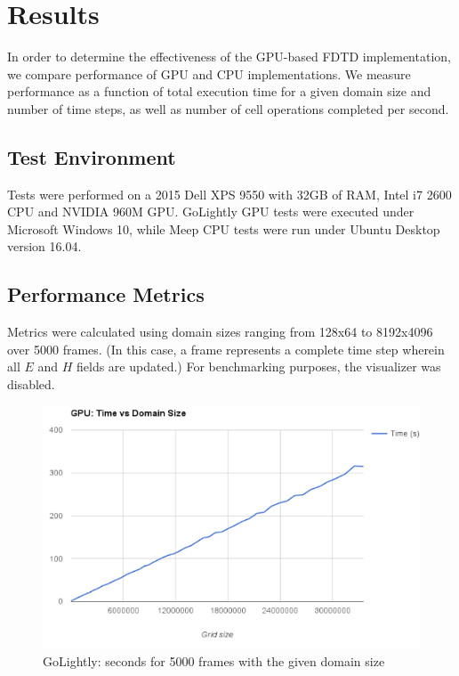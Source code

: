 \chapter{Results} \label{ch:conclusions}

In order to determine the effectiveness of the GPU-based FDTD implementation, we compare performance of GPU and CPU implementations. We measure performance as a function of total execution time for a given domain size and number of time steps, as well as number of cell operations completed per second. 

\section{Test Environment}

Tests were performed on a 2015 Dell XPS 9550 with 32GB of RAM, Intel i7 2600 CPU and NVIDIA 960M GPU. GoLightly GPU tests were executed under Microsoft Windows 10, while Meep CPU tests were run under Ubuntu Desktop version 16.04.   

\section{Performance Metrics}

Metrics were calculated using domain sizes ranging from 128x64 to 8192x4096 over 5000 frames. (In this case, a frame represents a complete time step wherein all $E$ and $H$ fields are updated.) For benchmarking purposes, the visualizer was disabled.


\begin{figure}[H]
	\centering
	\includegraphics[width=\textwidth,
	keepaspectratio]{gpu_time_vs_domain_size.png}
	\caption{GoLightly: seconds for 5000 frames with the given domain size}
	\label{fig:gpuTimeVsDomainSize}
\end{figure}

